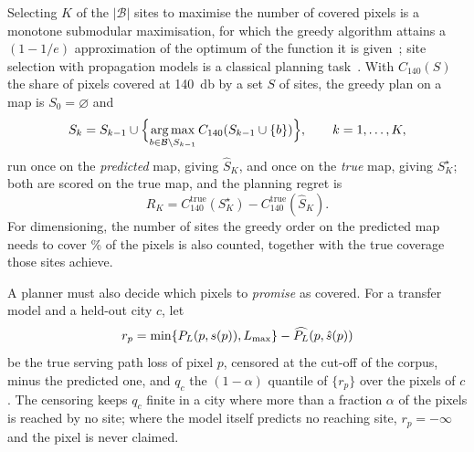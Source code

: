 Selecting $K$ of the $|\mathcal{B}|$ sites to maximise the number of covered
pixels is a monotone submodular maximisation, for which the greedy algorithm
attains a $(1-1/e)$ approximation of the optimum of the function it is
given~\cite{nemhauser1978}; site selection with propagation models is a
classical planning task~\cite{amaldi2003}. With $C_{140}(S)$ the share of
pixels covered at \SI{140}{\decibel} by a set $S$ of sites, the greedy plan
on a map is $S_{0}=\varnothing$ and
\begin{equation}
S_{k}=S_{k-1}\cup\Bigl\{\operatorname*{arg\,max}_{b\in\mathcal{B}\setminus S_{k-1}}C_{140}(S_{k-1}\cup\{b\})\Bigr\},
\qquad k=1,\dots,K,
\label{eq:greedy}
\end{equation}
run once on the \emph{predicted} map, giving $\hat S_K$, and once on the
\emph{true} map, giving $S_K^{\star}$; both are scored on the true map, and
the planning regret is
\begin{equation}
R_K=C_{140}^{\mathrm{true}}(S_K^{\star})-C_{140}^{\mathrm{true}}(\hat S_K).
\label{eq:regret}
\end{equation}
For dimensioning, the number of sites the greedy order on the predicted map
needs to cover \covTarget\% of the pixels is also counted, together with the
true coverage those sites achieve.

A planner must also decide which pixels to \emph{promise} as covered. For a
transfer model and a held-out city $c$, let
\begin{equation}
r_p=\min\{P_{L}(p,s(p)),L_{\max}\}-\widehat{P_{L}}(p,\hat s(p))
\label{eq:resid-cert}
\end{equation}
be the true serving path loss of pixel $p$, censored at the cut-off of the
corpus, minus the predicted one, and $q_c$ the $(1-\alpha)$ quantile of
$\{r_p\}$ over the pixels of $c$. The censoring keeps $q_c$ finite in a city
where more than a fraction $\alpha$ of the pixels is reached by no site;
where the model itself predicts no reaching site, $r_p=-\infty$ and the
pixel is never claimed.

